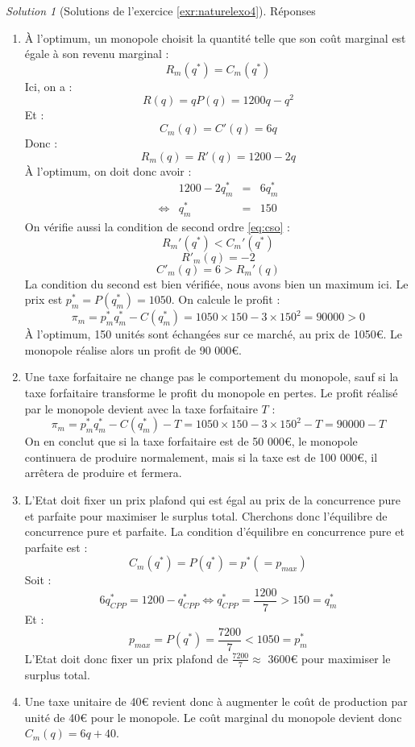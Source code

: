 \documentclass[
]{book}
\providecommand{\tightlist}{%
  \setlength{\itemsep}{0pt}\setlength{\parskip}{0pt}}
\theoremstyle{definition}
\theoremstyle{definition}
\theoremstyle{definition}
\theoremstyle{definition}
\theoremstyle{remark}
\newtheorem*{solution}{Solution}
\begin{document}
\begin{solution}[Solutions de l'exercice \ref{exr:naturelexo4}]

Réponses

\begin{enumerate}
\def\labelenumi{\arabic{enumi}.}
\tightlist
\item
  À l'optimum, un monopole choisit la quantité telle que son coût marginal est égale à son revenu marginal :
  \[R_m(q^*)=C_m(q^*)\]
  Ici, on a :
  \[R(q) =qP(q)=1200q-q^2\]
  Et :
  \[C_m(q)=C'(q)=6q\]
  Donc :
  \[R_m(q)=R'(q)=1200-2q\]
  À l'optimum, on doit donc avoir :
  \[
  \begin{array}{crcl}
  &1200-2q^*_m&=&6q^*_m\\
  \Leftrightarrow & q^*_m&=&150
  \end{array}
  \]
  On vérifie aussi la condition de second ordre \eqref{eq:cso} :
  \[R_m'(q^*)<C_m'(q^*)\]
  \[R'_m(q)=-2\]
  \[C'_m(q)=6>R_m'(q)\]
  La condition du second est bien vérifiée, nous avons bien un maximum ici.
  Le prix est \(p^*_m=P(q^*_m)=1050\).
  On calcule le profit :
  \[\pi_m=p_m^*q_m^*-C(q^*_m)=1050\times150-3\times150^2=90000>0\]
  À l'optimum, 150 unités sont échangées sur ce marché, au prix de 1050€.
  Le monopole réalise alors un profit de 90 000€.
\item
  Une taxe forfaitaire ne change pas le comportement du monopole, sauf si la taxe forfaitaire transforme le profit du monopole en pertes.
  Le profit réalisé par le monopole devient avec la taxe forfaitaire \(T\) :
  \[\pi_m=p_m^*q_m^*-C(q^*_m)-T=1050\times150-3\times150^2-T=90000-T\]
  On en conclut que si la taxe forfaitaire est de 50 000€, le monopole continuera de produire normalement, mais si la taxe est de 100 000€, il arrêtera de produire et fermera.
\item
  L'Etat doit fixer un prix plafond qui est égal au prix de la concurrence pure et parfaite pour maximiser le surplus total.
  Cherchons donc l'équilibre de concurrence pure et parfaite.
  La condition d'équilibre en concurrence pure et parfaite est :
  \[C_m(q^*)=P(q^*)=p^* (=p_{max})\]
  Soit :
  \[6q^*_{CPP}=1200-q^*_{CPP}\Leftrightarrow q^*_{CPP}=\frac{1200}{7}>150=q_m^*\]
  Et :
  \[p_{max}=P(q^*)=\frac{7200}{7}<1050=p_m^*\]
  L'Etat doit donc fixer un prix plafond de \(\frac{7200}{7}\approx\) 3600€ pour maximiser le surplus total.
\item
  Une taxe unitaire de 40€ revient donc à augmenter le coût de production par unité de 40€ pour le monopole.
  Le coût marginal du monopole devient donc \(C_m(q)=6q+40\).

\end{enumerate}
\end{solution}
\end{document}

